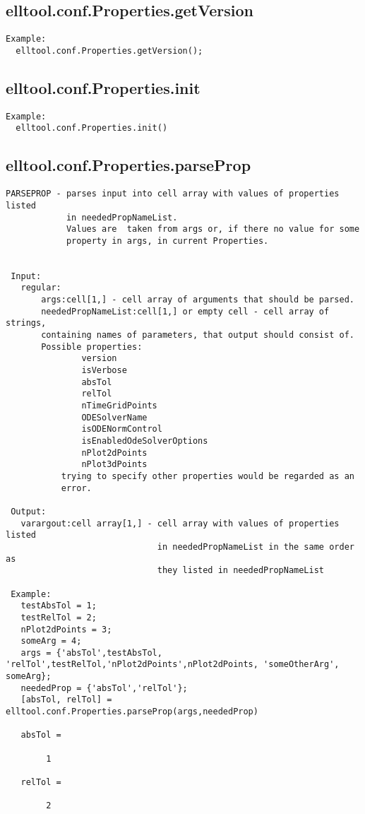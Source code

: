 \subsection{\texorpdfstring{elltool.conf.Properties.getVersion}{getVersion}}\label{method:elltool.conf.Properties.getVersion}
\begin{verbatim}
Example:
  elltool.conf.Properties.getVersion();
\end{verbatim}
\subsection{\texorpdfstring{elltool.conf.Properties.init}{init}}\label{method:elltool.conf.Properties.init}
\begin{verbatim}
Example:
  elltool.conf.Properties.init()
\end{verbatim}
\subsection{\texorpdfstring{elltool.conf.Properties.parseProp}{parseProp}}\label{method:elltool.conf.Properties.parseProp}
\begin{verbatim}
PARSEPROP - parses input into cell array with values of properties listed
            in neededPropNameList.
            Values are  taken from args or, if there no value for some
            property in args, in current Properties.


 Input:
   regular:
       args:cell[1,] - cell array of arguments that should be parsed.
       neededPropNameList:cell[1,] or empty cell - cell array of strings,
       containing names of parameters, that output should consist of.
       Possible properties:
               version
               isVerbose
               absTol
               relTol
               nTimeGridPoints
               ODESolverName
               isODENormControl
               isEnabledOdeSolverOptions
               nPlot2dPoints
               nPlot3dPoints
           trying to specify other properties would be regarded as an
           error.

 Output:
   varargout:cell array[1,] - cell array with values of properties listed
                              in neededPropNameList in the same order as
                              they listed in neededPropNameList

 Example:
   testAbsTol = 1;
   testRelTol = 2;
   nPlot2dPoints = 3;
   someArg = 4;
   args = {'absTol',testAbsTol, 'relTol',testRelTol,'nPlot2dPoints',nPlot2dPoints, 'someOtherArg', someArg};
   neededProp = {'absTol','relTol'};
   [absTol, relTol] = elltool.conf.Properties.parseProp(args,neededProp)

   absTol =

        1

   relTol =

        2
\end{verbatim}
